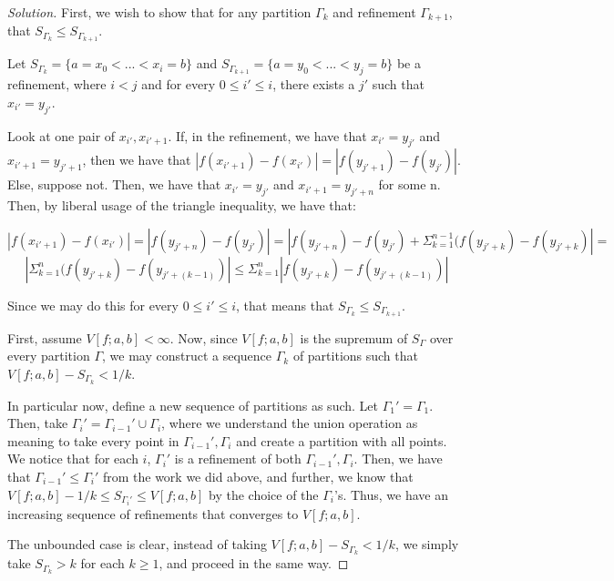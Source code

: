 \documentclass[10pt]{article}
\begin{document}
\begin{proof}[Solution]

First, we wish to show that for any partition $\Gamma_k$ and refinement $\Gamma_{k+1}$, that $S_{\Gamma_k} \leq S_{\Gamma_{k+1}}$. 

Let $ S_{\Gamma_k} = \{ a = x_0 < ... < x_i = b \}$ and $S_{\Gamma_{k+1}} = \{ a = y_0 < ... < y_j = b \}$ be a refinement, where $i < j$ and for every $0 \leq i' \leq i$, there exists a $j'$ such that $x_{i'} = y_{j'}$.

Look at one pair of $x_{i'}, x_{i' + 1}$. If, in the refinement, we have that $x_{i'} = y_{j'}$ and $x_{i'+1} = y_{j'+1}$, then we have that $|f(x_{i'+1}) - f(x_{i'})| = |f(y_{j'+1}) - f(y_{j'})|$. Else, suppose not. Then, we have that $x_{i'} = y_{j'}$ and $x_{i'+1} = y_{j'+n}$ for some n. Then, by liberal usage of the triangle inequality, we have that:

$$ |f(x_{i'+1}) - f(x_{i'})| = |f(y_{j'+n}) - f(y_{j'})| = \left|f(y_{j'+n}) - f(y_{j'}) + \Sigma_{k =1}^{n-1} (f(y_{j'+k}) - f(y_{j' +k}) \right| = $$
$$ \left|\Sigma_{k =1}^{n} (f(y_{j'+k}) - f(y_{j' + (k-1)}) \right| \leq \Sigma_{k=1}^n \left| f(y_{j'+k}) - f(y_{j' + (k-1)}) \right| $$

Since we may do this for every $0 \leq i' \leq i$, that means that $S_{\Gamma_k} \leq S_{\Gamma_{k+1}}$.

First, assume $V[f;a,b] < \infty$. Now, since $V[f; a,b]$ is the supremum of $S_\Gamma$ over every partition $\Gamma$, we may construct a sequence $\Gamma_k$ of partitions such that $V[f; a,b] - S_{\Gamma_k} < 1/k$.

In particular now, define a new sequence of partitions as such. Let $\Gamma_1' = \Gamma_1$. Then, take $\Gamma_i' = \Gamma_{i-1}' \cup \Gamma_{i}$, where we understand the union operation as meaning to take every point in $\Gamma_{i-1}', \Gamma_i$ and create a partition with all points. We notice that for each $i$, $\Gamma_i'$ is a refinement of both $\Gamma_{i-1}', \Gamma_{i}$. Then, we have that $\Gamma_{i-1}' \leq \Gamma_i'$ from the work we did above, and further, we know that $V[f;a,b] - 1/k \leq S_{\Gamma_i'} \leq V[f;a,b]$ by the choice of the $\Gamma_i$'s. Thus, we have an increasing sequence of refinements that converges to $V[f;a,b]$.

The unbounded case is clear, instead of taking  $V[f; a,b] - S_{\Gamma_k} < 1/k$, we simply take $S_{\Gamma_k} > k$ for each $k \geq 1$, and proceed in the same way.

 


\end{proof}
\end{document}
